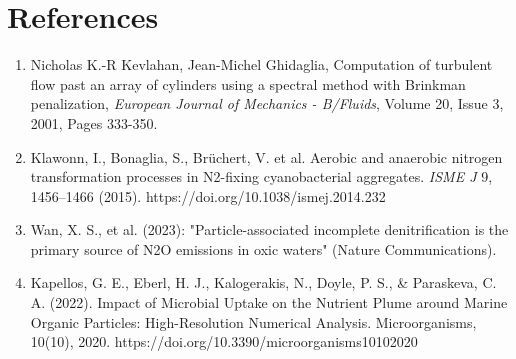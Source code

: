\documentclass{article}
\begin{document}
\section{References}
\begin{enumerate}
    \item Nicholas K.-R Kevlahan, Jean-Michel Ghidaglia, Computation of turbulent flow past an array of cylinders using a spectral method with Brinkman penalization, \textit{European Journal of Mechanics - B/Fluids}, Volume 20, Issue 3, 2001, Pages 333-350.
    \item Klawonn, I., Bonaglia, S., Brüchert, V. et al. Aerobic and anaerobic nitrogen transformation processes in N2-fixing cyanobacterial aggregates. \textit{ISME J} 9, 1456–1466 (2015). https://doi.org/10.1038/ismej.2014.232
    \item Wan, X. S., et al. (2023): "Particle-associated incomplete denitrification is the primary source of N2O emissions in oxic waters" (Nature Communications). 
    \item Kapellos, G. E., Eberl, H. J., Kalogerakis, N., Doyle, P. S., \& Paraskeva, C. A. (2022). Impact of Microbial Uptake on the Nutrient Plume around Marine Organic Particles: High-Resolution Numerical Analysis. Microorganisms, 10(10), 2020. https://doi.org/10.3390/microorganisms10102020
\end{enumerate}
\end{document}

